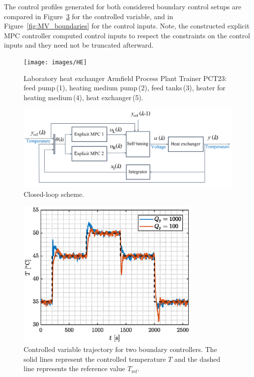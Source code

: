 \documentclass[preprint,12pt]{elsarticle}
\begin{document}
The control profiles generated for both considered boundary control setups are compared in Figure~\ref{fig:CV_boundaries} for the controlled variable, and in Figure~\ref{fig:MV_boundaries} for the control inputs. 
Note, the constructed explicit MPC controller computed control inputs to respect the constraints on the control inputs and they need not be truncated afterward.		

\begin{figure}
	\begin{center}
		\texttt{[image: images/HE]}
		\caption[Heat exchanger Armfield Process Plant Trainer PCT23]{Laboratory heat exchanger Armfield Process Plant Trainer PCT23: feed pump\,(1), heating medium pump\,(2), feed tanks\,(3), heater for heating medium\,(4), heat exchanger\,(5).}
		\label{fig:HE}
	\end{center}
\end{figure}

\begin{figure}
	\begin{center}
		\includegraphics[width=\textwidth]{images/cl}
		\caption[Closed-loop scheme]{Closed-loop scheme.}
		\label{fig:CL}
	\end{center}
\end{figure}

\begin{figure}
	\begin{center}
		\includegraphics[width=0.8\textwidth]{images/CV_boundaries}
		\caption{Controlled variable trajectory for two boundary controllers. The solid lines represent the controlled temperature $T$ and the dashed line represents the reference value $T_{\mathrm{ref}}$.}
		\label{fig:CV_boundaries}
	\end{center}
\end{figure}
\end{document}
